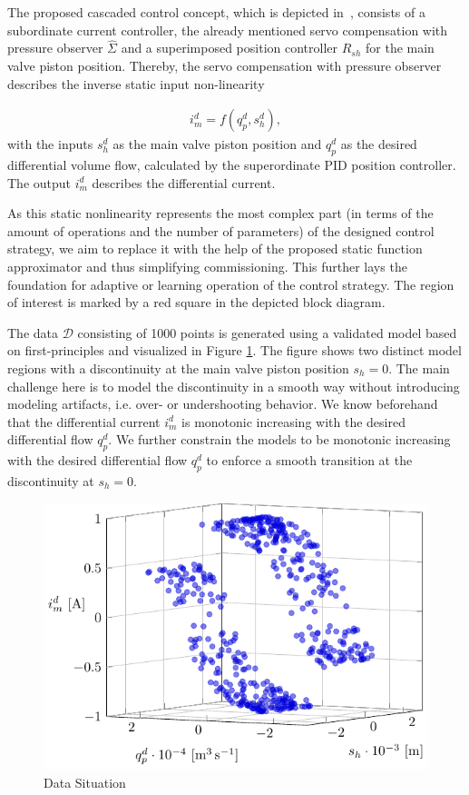 The proposed cascaded control concept, which is depicted in~, consists of a subordinate current controller, the already mentioned servo compensation with pressure observer $\hat{\Sigma}$ and a superimposed position controller $R_{sh}$ for the main valve piston position. Thereby, the servo compensation with pressure observer describes the inverse static input non-linearity 

\begin{align}
	i_m^d = f(q_p^d, s_h^d),
\end{align}
%
with the inputs $s_h^d$ as the main valve piston position and $q_p^d$ as the desired differential volume flow, calculated by the superordinate PID position controller. The output $i_m^d$ describes the differential current. 


As this static nonlinearity represents the most complex part (in terms of the amount of operations and the number of parameters) of the designed control strategy, we aim to replace it with the help of the proposed static function approximator and thus simplifying commissioning. This further lays the foundation for adaptive or learning operation of the control strategy. The region of interest is marked by a red square in the depicted block diagram.


The data $\mathcal{D}$ consisting of 1000 points is generated using a validated model based on first-principles and visualized in Figure \ref{fig:bosch_data_situation}. The figure shows two distinct model regions with a discontinuity at the main valve piston position $s_h = 0$. The main challenge here is to model the discontinuity in a smooth way without introducing modeling artifacts, i.e. over- or undershooting behavior. We know beforehand that the differential current $i_m^d$ is monotonic increasing with the desired differential flow $q_p^d$. We further constrain the models to be monotonic increasing with the desired differential flow $q_p^d$ to enforce a smooth transition at the discontinuity at $s_h = 0$.

\begin{figure}[H]
	\centering
	\includegraphics{graphics/pgfplots/cha5/Bosch/data_situation.pdf} 
	\caption{Data Situation}
	\label{fig:bosch_data_situation}
\end{figure}

